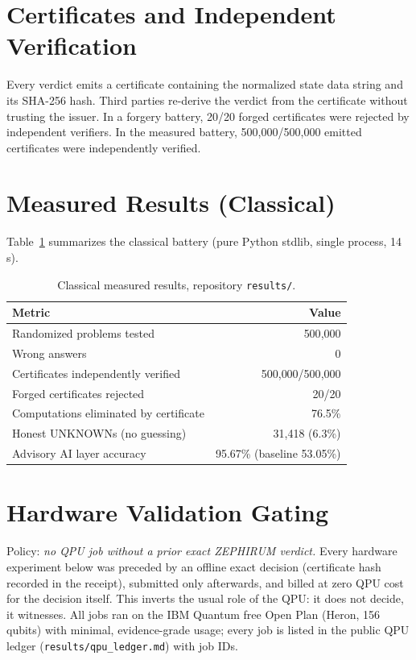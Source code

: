 \documentclass[11pt]{article}
\begin{document}
\section{Certificates and Independent Verification}
Every verdict emits a certificate containing the normalized state data
string and its SHA-256 hash. Third parties re-derive the verdict from
the certificate without trusting the issuer. In a forgery battery, 20/20
forged certificates were rejected by independent verifiers. In the
measured battery, 500{,}000/500{,}000 emitted certificates were
independently verified.

\section{Measured Results (Classical)}
Table~\ref{tab:classical} summarizes the classical battery (pure
Python stdlib, single process, 14\,s).

\begin{table}[h]
\centering
\begin{tabular}{lr}
\toprule
\textbf{Metric} & \textbf{Value} \\
\midrule
Randomized problems tested & 500{,}000 \\
Wrong answers & 0 \\
Certificates independently verified & 500{,}000/500{,}000 \\
Forged certificates rejected & 20/20 \\
Computations eliminated by certificate & 76.5\% \\
Honest UNKNOWNs (no guessing) & 31{,}418 (6.3\%) \\
Advisory AI layer accuracy & 95.67\% (baseline 53.05\%) \\
\bottomrule
\end{tabular}
\caption{Classical measured results, repository \texttt{results/}.}
\label{tab:classical}
\end{table}

\section{Hardware Validation Gating}
\label{sec:honesty}
Policy: \emph{no QPU job without a prior exact ZEPHIRUM verdict.} Every
hardware experiment below was preceded by an offline exact decision
(certificate hash recorded in the receipt), submitted only afterwards,
and billed at zero QPU cost for the decision itself. This inverts the
usual role of the QPU: it does not decide, it witnesses. All jobs ran on
the IBM Quantum free Open Plan (Heron, 156 qubits) with minimal,
evidence-grade usage; every job is listed in the public QPU ledger
(\texttt{results/qpu\_ledger.md}) with job IDs.
\end{document}
